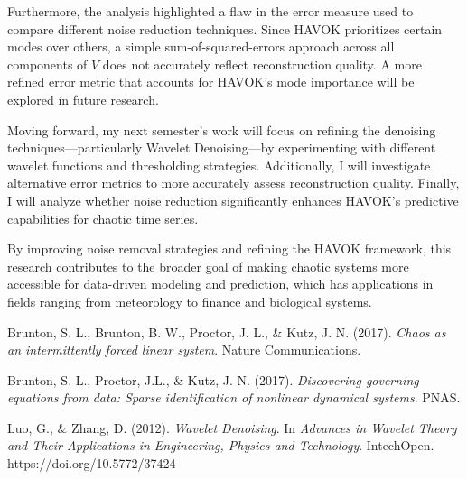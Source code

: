 \documentclass[11pt]{article}
\begin{document}
	Furthermore, the analysis highlighted a flaw in the error measure used to compare different noise reduction techniques. Since HAVOK prioritizes certain modes over others, a simple sum-of-squared-errors approach across all components of \(V\) does not accurately reflect reconstruction quality. A more refined error metric that accounts for HAVOK’s mode importance will be explored in future research.
	
	Moving forward, my next semester's work will focus on refining the denoising techniques—particularly Wavelet Denoising—by experimenting with different wavelet functions and thresholding strategies. Additionally, I will investigate alternative error metrics to more accurately assess reconstruction quality. Finally, I will analyze whether noise reduction significantly enhances HAVOK’s predictive capabilities for chaotic time series.
	
	By improving noise removal strategies and refining the HAVOK framework, this research contributes to the broader goal of making chaotic systems more accessible for data-driven modeling and prediction, which has applications in fields ranging from meteorology to finance and biological systems.
	

	\begin{thebibliography}{99}
		
		Brunton, S. L., Brunton, B. W., Proctor, J. L., \& Kutz, J. N. (2017). \textit{Chaos as an intermittently forced linear system}. Nature Communications.
		
		Brunton, S. L., Proctor, J.L., \& Kutz, J. N. (2017). \textit{Discovering governing equations from data: Sparse identification of nonlinear dynamical systems}. PNAS.
		
		Luo, G., \& Zhang, D. (2012). \textit{Wavelet Denoising}. In \textit{Advances in Wavelet Theory and Their Applications in Engineering, Physics and Technology}. IntechOpen. https://doi.org/10.5772/37424
		
		
	\end{thebibliography}
	
\end{document}
